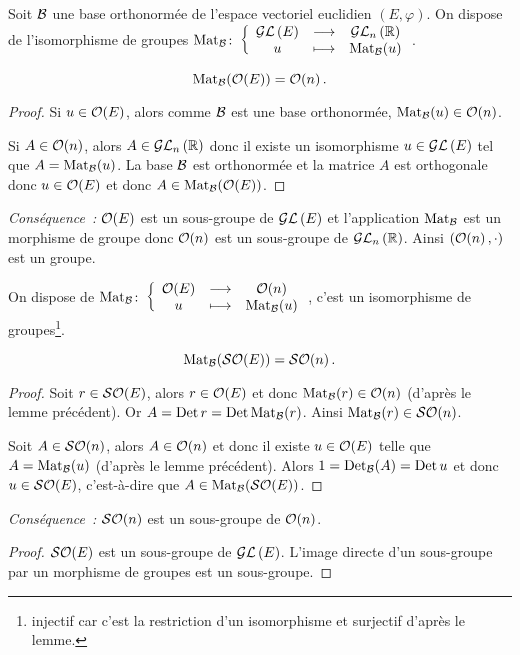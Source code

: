 Soit $\B$ une base orthonormée de l'espace vectoriel euclidien $(E, \varphi)$. On dispose de l'isomorphisme de groupes $\fonction{\Mat_\B}{\GL{E}}{\GLn{n}{\R}}{u}{\Mat_\B(u)}$.

\begin{lemme}
  \begin{equation}
    \Mat_\B(\Orth{E})=\Orth{n}.
  \end{equation}
\end{lemme}
\begin{proof}
  Si $u \in \Orth{E}$, alors comme $\B$ est une base orthonormée, $\Mat_\B(u) \in \Orth{n}$.

  Si $A \in \Orth{n}$, alors $A \in \GLn{n}{\R}$ donc il existe un isomorphisme $u \in \GL{E}$ tel que $A=\Mat_\B(u)$. La base $\B$ est orthonormée et la matrice $A$ est orthogonale donc $u \in \Orth{E}$ et donc $A \in \Mat_\B(\Orth{E})$.
\end{proof}

\emph{Conséquence~:} $\Orth{E}$ est un sous-groupe de $\GL{E}$ et l'application $\Mat_\B$ est un morphisme de groupe donc $\Orth{n}$ est un sous-groupe de $\GLn{n}{\R}$. Ainsi $(\Orth{n}, \cdot)$ est un groupe.

On dispose de $\fonction{\Mat_\B}{\Orth{E}}{\Orth{n}}{u}{\Mat_\B(u)}$, c'est un isomorphisme de groupes\footnote{injectif car c'est la restriction d'un isomorphisme et surjectif d'après le lemme.}.

\begin{lemme}
  \begin{equation}
    \Mat_\B(\SOrth{E})=\SOrth{n}.
  \end{equation}
\end{lemme}
\begin{proof}
  Soit $r \in \SOrth{E}$, alors $r \in \Orth{E}$ et donc $\Mat_\B(r) \in \Orth{n}$ (d'après le lemme précédent). Or $A=\Det r = \Det \Mat_\B(r)$. Ainsi $\Mat_\B(r) \in \SOrth{n}$.

  Soit $A \in \SOrth{n}$, alors $A \in \Orth{n}$ et donc il existe $u \in \Orth{E}$ telle que $A = \Mat_\B(u)$ (d'après le lemme précédent). Alors $1=\Det_\B(A)=\Det u$ et donc $u \in \SOrth{E}$, c'est-à-dire que $A \in \Mat_\B (\SOrth{E})$.
\end{proof}

\emph{Conséquence~:} $\SOrth{n}$ est un sous-groupe de $\Orth{n}$.
\begin{proof}
  $\SOrth{E}$ est un sous-groupe de $\GL{E}$. L'image directe d'un sous-groupe par un morphisme de groupes est un sous-groupe.
\end{proof}

